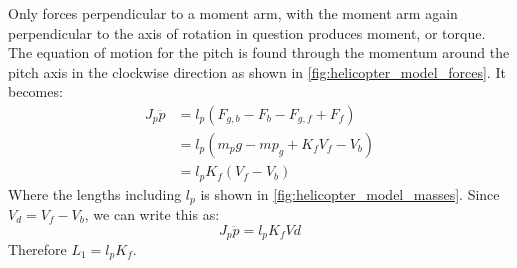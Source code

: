 %
Only forces perpendicular to a moment arm, with the moment arm again
perpendicular to the axis of rotation in question produces moment, or
torque. The equation of motion for the pitch is found through the
momentum around the pitch axis in the clockwise direction as shown in
\cref{fig:helicopter_model_forces}. It becomes:
%
\begin{align*}
  J_p\ddot{p} &= l_p(F_{g,b} - F_b - F_{g,f} + F_f) \\
              &= l_p(m_pg - mp_g + K_fV_f - V_b) \\
              &= l_pK_f(V_f-V_b)
\end{align*}
%
Where the lengths including $l_p$ is shown in
\cref{fig:helicopter_model_masses}. Since $V_d = V_f-V_b$, we can
write this as:
%
\begin{equation}
  \label{eq:pitch EoM}
  J_p\ddot{p} = l_pK_fVd
\end{equation}
Therefore $L_1 = l_pK_f$.

